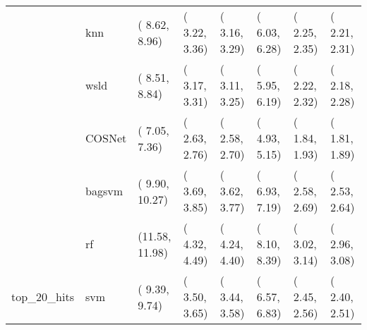 \begin{table}[H]
{\begin{tabular}{llllllll}
 & knn & ( 8.62,  8.96) & ( 3.22,  3.36) & ( 3.16,  3.29) & ( 6.03,  6.28) & ( 2.25,  2.35) & ( 2.21,  2.31)\\

 & wsld & ( 8.51,  8.84) & ( 3.17,  3.31) & ( 3.11,  3.25) & ( 5.95,  6.19) & ( 2.22,  2.32) & ( 2.18,  2.28)\\

 & COSNet & ( 7.05,  7.36) & ( 2.63,  2.76) & ( 2.58,  2.70) & ( 4.93,  5.15) & ( 1.84,  1.93) & ( 1.81,  1.89)\\

 & bagsvm & ( 9.90, 10.27) & ( 3.69,  3.85) & ( 3.62,  3.77) & ( 6.93,  7.19) & ( 2.58,  2.69) & ( 2.53,  2.64)\\

 & rf & (11.58, 11.98) & ( 4.32,  4.49) & ( 4.24,  4.40) & ( 8.10,  8.39) & ( 3.02,  3.14) & ( 2.96,  3.08)\\

\multirow{-15}{*}{\raggedright\arraybackslash top\_20\_hits} & svm & ( 9.39,  9.74) & ( 3.50,  3.65) & ( 3.44,  3.58) & ( 6.57,  6.83) & ( 2.45,  2.56) & ( 2.40,  2.51)\\
\bottomrule
\end{tabular}}
\end{table}
